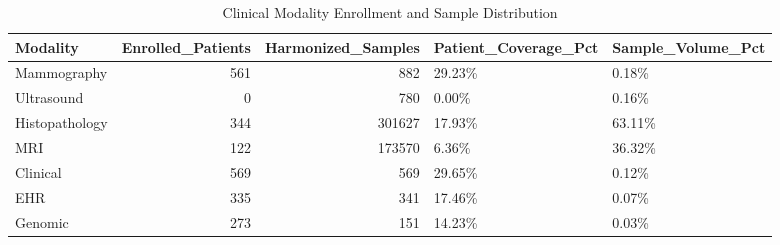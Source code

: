 \begin{table}
\caption{Clinical Modality Enrollment and Sample Distribution}
\label{tab:table_modality_statistics}
\begin{tabular}{lrrll}
\toprule
Modality & Enrolled\_Patients & Harmonized\_Samples & Patient\_Coverage\_Pct & Sample\_Volume\_Pct \\
\midrule
Mammography & 561 & 882 & 29.23\% & 0.18\% \\
Ultrasound & 0 & 780 & 0.00\% & 0.16\% \\
Histopathology & 344 & 301627 & 17.93\% & 63.11\% \\
MRI & 122 & 173570 & 6.36\% & 36.32\% \\
Clinical & 569 & 569 & 29.65\% & 0.12\% \\
EHR & 335 & 341 & 17.46\% & 0.07\% \\
Genomic & 273 & 151 & 14.23\% & 0.03\% \\
\bottomrule
\end{tabular}
\end{table}

